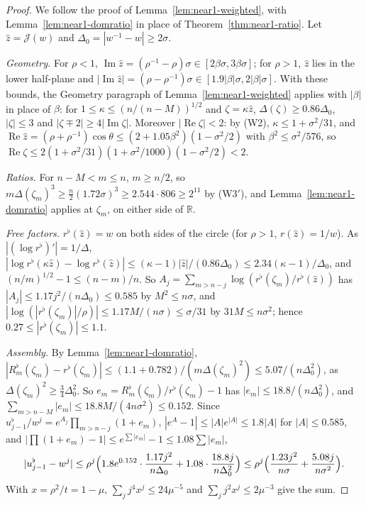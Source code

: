 \documentclass[11pt]{amsart}
\theoremstyle{definition}
\theoremstyle{remark}
\numberwithin{equation}{section}
\newcommand{\R}{\mathbb{R}}
\DeclareMathOperator{\re}{Re}
\DeclareMathOperator{\im}{Im}
\begin{document}
\begin{proof}
We follow the proof of Lemma~\ref{lem:near1-weighted}, with Lemma~\ref{lem:near1-domratio} in place of Theorem~\ref{thm:near1-ratio}. Let $\hat z=\mathcal J(w)$ and $\Delta_0=|w^{-1}-w|\ge2\sigma$.

\emph{Geometry.} For $\rho<1$, $\im\hat z=(\rho^{-1}-\rho)\sigma\in[2\beta\sigma,3\beta\sigma]$; for $\rho>1$, $\hat z$ lies in the lower half-plane and $|\im\hat z|=(\rho-\rho^{-1})\sigma\in[1.9|\beta|\sigma,2|\beta|\sigma]$. With these bounds, the Geometry paragraph of Lemma~\ref{lem:near1-weighted} applies with $|\beta|$ in place of $\beta$: for $1\le\kappa\le(n/(n-M))^{1/2}$ and $\zeta=\kappa\hat z$, $\Delta(\zeta)\ge0.86\Delta_0$, $|\zeta|\le3$ and $|\zeta\mp2|\ge4|\im\zeta|$. Moreover $|\re\zeta|<2$: by (W2), $\kappa\le1+\sigma^2/31$, and $\re\hat z=(\rho+\rho^{-1})\cos\theta\le(2+1.05\beta^2)(1-\sigma^2/2)$ with $\beta^2\le\sigma^2/576$, so $\re\zeta\le2(1+\sigma^2/31)(1+\sigma^2/1000)(1-\sigma^2/2)<2$.

\emph{Ratios.} For $n-M<m\le n$, $m\ge n/2$, so $m\Delta(\zeta_m)^3\ge\frac n2(1.72\sigma)^3\ge2.544\cdot806\ge2^{11}$ by (W3$'$), and Lemma~\ref{lem:near1-domratio} applies at $\zeta_m$, on either side of $\R$.

\emph{Free factors.} $r^\flat(\hat z)=w$ on both sides of the circle (for $\rho>1$, $r(\hat z)=1/w$). As $|(\log r^\flat)'|=1/\Delta$, $|\log r^\flat(\kappa\hat z)-\log r^\flat(\hat z)|\le(\kappa-1)|\hat z|/(0.86\Delta_0)\le2.34(\kappa-1)/\Delta_0$, and $(n/m)^{1/2}-1\le(n-m)/n$. So $A_j=\sum_{m>n-j}\log(r^\flat(\zeta_m)/r^\flat(\hat z))$ has $|A_j|\le1.17j^2/(n\Delta_0)\le0.585$ by $M^2\le n\sigma$, and $|\log(|r^\flat(\zeta_m)|/\rho)|\le1.17M/(n\sigma)\le\sigma/31$ by $31M\le n\sigma^2$; hence $0.27\le|r^\flat(\zeta_m)|\le1.1$.

\emph{Assembly.} By Lemma~\ref{lem:near1-domratio}, $|R_m^\flat(\zeta_m)-r^\flat(\zeta_m)|\le(1.1+0.782)/(m\Delta(\zeta_m)^2)\le5.07/(n\Delta_0^2)$, as $\Delta(\zeta_m)^2\ge\frac34\Delta_0^2$. So $e_m=R_m^\flat(\zeta_m)/r^\flat(\zeta_m)-1$ has $|e_m|\le18.8/(n\Delta_0^2)$, and $\sum_{m>n-M}|e_m|\le18.8M/(4n\sigma^2)\le0.152$. Since $u_{j-1}^\flat/w^j=e^{A_j}\prod_{m>n-j}(1+e_m)$, $|e^A-1|\le|A|e^{|A|}\le1.8|A|$ for $|A|\le0.585$, and $|\prod(1+e_m)-1|\le e^{\sum|e_m|}-1\le1.08\sum|e_m|$,
\[
|u_{j-1}^\flat-w^j|\le\rho^j\Bigl(1.8e^{0.152}\cdot\frac{1.17j^2}{n\Delta_0}+1.08\cdot\frac{18.8j}{n\Delta_0^2}\Bigr)\le\rho^j\Bigl(\frac{1.23j^2}{n\sigma}+\frac{5.08j}{n\sigma^2}\Bigr).
\]
With $x=\rho^2/t=1-\mu$, $\sum_jj^4x^j\le24\mu^{-5}$ and $\sum_jj^2x^j\le2\mu^{-3}$ give the sum.
\end{proof}
\end{document}
